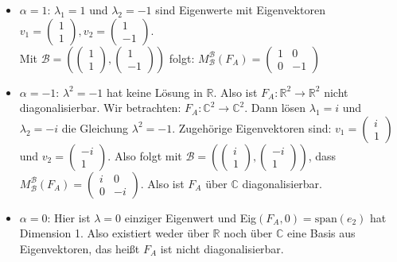 \documentclass{scrbook}
\begin{document}
\begin{itemize}
\item $\alpha = 1$:  $\lambda_1 = 1$ und $\lambda_2 = -1$ sind Eigenwerte mit Eigenvektoren $v_1=\left(\begin{array}{c}
1\\1
\end{array}
\right),v_2=\left(\begin{array}{c}
1\\-1
\end{array}
\right)$.\\Mit $\mathscr{B} = \left(\left(\begin{array}{c}
1\\1
\end{array}
\right),\left(\begin{array}{c}
1\\-1
\end{array}
\right)\right)$ folgt: $M^\mathscr{B}_\mathscr{B}(F_A) = \left(
\begin{array}{cc}
1&0\\
0&-1
\end{array}
\right)$
\item $\alpha = -1$: $\lambda^2 = -1$ hat keine Lösung in $\mathbb{R}$. Also ist $F_A: \mathbb{R}^2 \rightarrow \mathbb{R}^2$ nicht diagonalisierbar. Wir betrachten: $F_A:\mathbb{C}^2 \rightarrow \mathbb{C}^2$. Dann lösen $\lambda_1 = i$ und $\lambda_2 = -i$ die Gleichung $\lambda^2 =-1$. Zugehörige Eigenvektoren sind: $v_1 = \left(
\begin{array}{c}
i\\1
\end{array}
\right)$ und $v_2 = \left(
\begin{array}{c}
-i\\1
\end{array}
\right)$. Also folgt mit $\mathscr{B} =\left(\left(
\begin{array}{c}
i\\1
\end{array}
\right), \left(
\begin{array}{c}
-i\\1
\end{array}
\right)\right) $, dass $M^\mathscr{B}_\mathscr{B}(F_A)= \left(
\begin{array}{cc}
i&0\\
0&-i
\end{array}
\right)$. Also ist $F_A$ über $\mathbb{C}$ diagonalisierbar.
\item $\alpha = 0$: Hier ist $\lambda = 0$ einziger Eigenwert und Eig$(F_A,0)= \text{span}(e_2)$ hat Dimension 1. Also existiert weder über $\mathbb{R}$ noch über $\mathbb{C}$ eine Basis aus Eigenvektoren, das heißt $F_A$ ist nicht diagonalisierbar.
\end{itemize}
\end{document}
